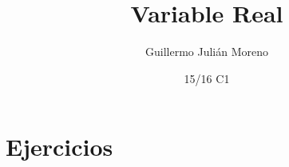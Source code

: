 \documentclass{apuntes}
\title{Variable Real}
\author{Guillermo Julián Moreno}
\date{15/16 C1}
\begin{document}
\pagestyle{plain}
\maketitle

\tableofcontents
\newpage

\appendix

\chapter{Ejercicios}

\printindex
\end{document}
